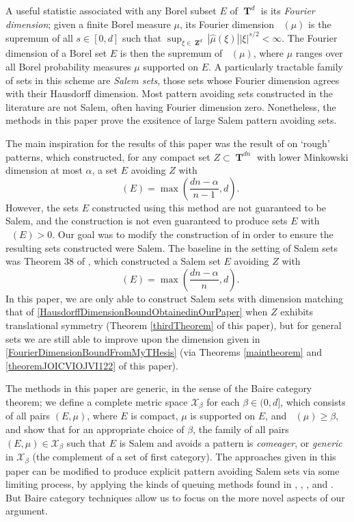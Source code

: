 \documentclass[dvipsnames,letterpaper,12pt]{article}
\numberwithin{equation}{section}
\DeclareMathOperator{\hausdim}{\dim_{\mathbf{H}}}
\DeclareMathOperator{\fordim}{\dim_{\mathbf{F}}}
\DeclareMathOperator{\ZZ}{\mathbf{Z}}
\DeclareMathOperator{\TT}{\mathbf{T}}
\numberwithin{theorem}{section}
\begin{document}
A useful statistic associated with any Borel subset $E$ of $\TT^d$ is its \emph{Fourier dimension}; given a finite Borel measure $\mu$, its Fourier dimension $\fordim(\mu)$ is the supremum of all $s \in [0,d]$ such that $\sup_{\xi \in \ZZ^d} |\widehat{\mu}(\xi)| |\xi|^{s/2} < \infty$. The Fourier dimension of a Borel set $E$ is then the supremum of $\fordim(\mu)$, where $\mu$ ranges over all Borel probability measures $\mu$ supported on $E$. A particularly tractable family of sets in this scheme are \emph{Salem sets}, those sets whose Fourier dimension agrees with their Hausdorff dimension. Most pattern avoiding sets constructed in the literature are not Salem, often having Fourier dimension zero. Nonetheless, the methods in this paper prove the exsitence of large Salem pattern avoiding sets.

The main inspiration for the results of this paper was the result of \cite{OurPaper} on `rough' patterns, which constructed, for any compact set $Z \subset \TT^{dn}$ with lower Minkowski dimension at most $\alpha$, a set $E$ avoiding $Z$ with
%
\begin{equation} \label{HausdorffDimensionBoundObtainedinOurPaper}
    \hausdim(E) = \max\left( \frac{dn - \alpha}{n - 1}, d \right).
\end{equation}
%
However, the sets $E$ constructed using this method are not guaranteed to be Salem, and the construction is not even guaranteed to produce sets $E$ with $\fordim(E) > 0$. Our goal was to modify the construction of \cite{OurPaper} in order to ensure the resulting sets constructed were Salem. The baseline in the setting of Salem sets was Theorem 38 of \cite{MyThesis}, which constructed a Salem set $E$ avoiding $Z$ with
%
\begin{equation} \label{FourierDimensionBoundFromMyTHesis}
    \fordim(E) = \max \left( \frac{dn - \alpha}{n}, d \right).
\end{equation}
%
In this paper, we are only able to construct Salem sets with dimension matching that of \eqref{HausdorffDimensionBoundObtainedinOurPaper} when $Z$ exhibits translational symmetry (Theorem \ref{thirdTheorem} of this paper), but for general sets we are still able to improve upon the dimension given in \eqref{FourierDimensionBoundFromMyTHesis} (via Theorems \ref{maintheorem} and \ref{theoremJOICVIOJVI122} of this paper).

The methods in this paper are generic, in the sense of the Baire category theorem; we define a complete metric space $\mathcal{X}_\beta$ for each $\beta \in (0,d]$, which consists of all pairs $(E,\mu)$, where $E$ is compact, $\mu$ is supported on $E$, and $\fordim(\mu) \geq \beta$, and show that for an appropriate choice of $\beta$, the family of all pairs $(E,\mu) \in \mathcal{X}_\beta$ such that $E$ is Salem and avoids a pattern is \emph{comeager}, or \emph{generic} in $\mathcal{X}_\beta$ (the complement of a set of first category). The approaches given in this paper can be modified to produce explicit pattern avoiding Salem sets via some limiting process, by applying the kinds of queuing methods found in \cite{OurPaper}, \cite{MyThesis}, \cite{PramanikFraser}, and \cite{Keleti}. But Baire category techniques allow us to focus on the more novel aspects of our argument.
\end{document}
